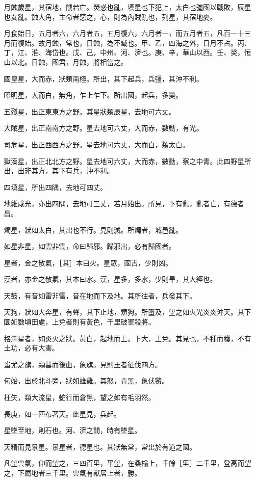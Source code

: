 月蝕歲星，其宿地，饑若亡。熒惑也亂，填星也下犯上，太白也彊國以戰敗，辰星也女亂。蝕大角，主命者惡之，心，則為內賊亂也，列星，其宿地憂。

月食始日，五月者六，六月者五，五月復六，六月者一，而五月者五，凡百一十三月而復始。故月蝕，常也，日蝕，為不臧也。甲、乙，四海之外，日月不占。丙、丁，江、淮、海岱也。戊、己，中州、河、濟也。庚、辛，華山以西。壬、癸，恒山以北。日蝕，國君，月蝕，將相當之。

國皇星，大而赤，狀類南極。所出，其下起兵，兵彊，其沖不利。

昭明星，大而白，無角，乍上乍下。所出國，起兵，多變。

五殘星，出正東東方之野。其星狀類辰星，去地可六丈。

大賊星，出正南南方之野。星去地可六丈，大而赤，數動，有光。

司危星，出正西西方之野。星去地可六丈，大而白，類太白。

獄漢星，出正北北方之野。星去地可六丈，大而赤，數動，察之中青。此四野星所出，出非其方，其下有兵，沖不利。

四填星，所出四隅，去地可四丈。

地維咸光，亦出四隅，去地可三丈，若月始出。所見，下有亂，亂者亡，有德者昌。

燭星，狀如太白，其出也不行。見則滅。所燭者，城邑亂。

如星非星，如雲非雲，命曰歸邪。歸邪出，必有歸國者。

星者，金之散氣，［其］本曰火。星眾，國吉，少則凶。

漢者，亦金之散氣，其本曰水。漢，星多，多水，少則旱，其大經也。

天鼓，有音如雷非雷，音在地而下及地。其所往者，兵發其下。

天狗，狀如大奔星，有聲，其下止地，類狗。所墮及，望之如火光炎炎沖天。其下圜如數頃田處，上兌者則有黃色，千里破軍殺將。

格澤星者，如炎火之狀。黃白，起地而上。下大，上兌。其見也，不種而穫，不有土功，必有大害。

蚩尤之旗，類彗而後曲，象旗。見則王者征伐四方。

旬始，出於北斗旁，狀如雄雞。其怒，青黑，象伏鱉。

枉矢，類大流星，蛇行而倉黑，望之如有毛羽然。

長庚，如一匹布著天。此星見，兵起。

星墜至地，則石也。河、濟之閒，時有墜星。

天精而見景星。景星者，德星也。其狀無常，常出於有道之國。

凡望雲氣，仰而望之，三四百里，平望，在桑榆上，千餘［里］二千里，登高而望之，下屬地者三千里。雲氣有獸居上者，勝。


